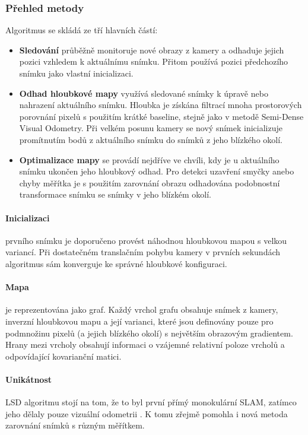 \documentclass[12pt,a4paper]{article}
\begin{document}
\subsubsection*{Přehled metody}
Algoritmus se skládá ze tří hlavních částí:
\begin{itemize}
	\item \textbf{Sledování} průběžně monitoruje nové obrazy z kamery a odhaduje jejich pozici vzhledem k aktuálnímu snímku. Přitom používá pozici předchozího snímku jako vlastní inicializaci. 
	\item \textbf{Odhad hloubkové mapy} využívá sledované snímky k úpravě nebo nahrazení aktuálního snímku. Hloubka je získána filtrací mnoha prostorových porovnání pixelů s použitím krátké baseline, stejně jako v metodě Semi-Dense Visual Odometry. Při velkém posunu kamery se nový snímek inicializuje promítnutím bodů z aktuálního snímku do snímků z jeho blízkého okolí. 
	\item \textbf{Optimalizace mapy} se provádí nejdříve ve chvíli, kdy je u aktuálního snímku ukončen jeho hloubkový odhad. Pro detekci uzavření smyčky anebo chyby měřítka je s použitím zarovnání obrazu odhadována podobnostní transformace snímku se snímky v jeho blízkém okolí.
\end{itemize}

\paragraph{Inicializaci} prvního snímku je doporučeno provést náhodnou hloubkovou mapou s velkou variancí. Při dostatečném translačním pohybu kamery v prvních sekundách algoritmus sám konverguje ke správné hloubkové konfiguraci.

\paragraph{Mapa} je reprezentována jako graf. Každý vrchol grafu obsahuje snímek z kamery, inverzní hloubkovou mapu a její varianci, které jsou definovány pouze pro podmnožinu pixelů (a jejich blízkého okolí) s největším obrazovým gradientem. Hrany mezi vrcholy obsahují informaci o vzájemné relativní poloze vrcholů a odpovídající kovarianční matici.

\paragraph{Unikátnost} LSD algoritmu stojí na tom, že to byl první přímý monokulární SLAM, zatímco jeho  dělaly pouze vizuální odometrii \cite{Engel14_LSD}. K tomu zřejmě pomohla i nová metoda zarovnání snímků s různým měřítkem. 
\end{document}

